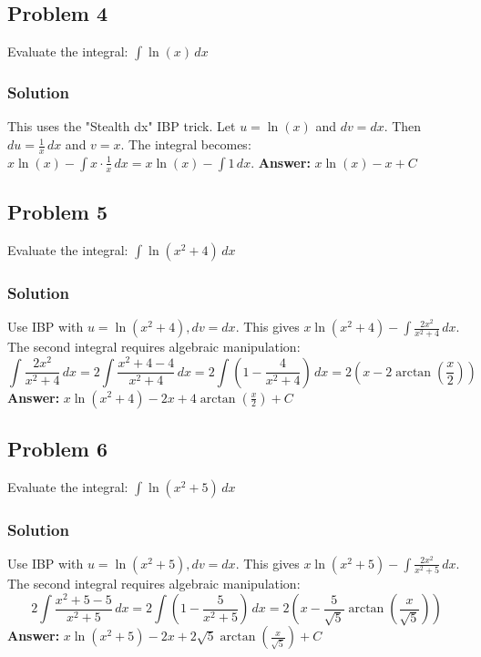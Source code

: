 \documentclass{article}
\begin{document}
\subsection{Problem 4}
Evaluate the integral: $ \int \ln(x) \,dx $
\subsubsection*{Solution}
This uses the "Stealth dx" IBP trick. Let $ u = \ln(x) $ and $ dv = dx $.
Then $ du = \frac{1}{x} \,dx $ and $ v = x $.
The integral becomes: $ x\ln(x) - \int x \cdot \frac{1}{x} \,dx = x\ln(x) - \int 1 \,dx $.
\textbf{Answer:} $ x\ln(x) - x + C $


\subsection{Problem 5}
Evaluate the integral: $ \int \ln(x^2 + 4) \,dx $
\subsubsection*{Solution}
Use IBP with $u=\ln(x^2+4), dv=dx$. This gives $x\ln(x^2+4) - \int \frac{2x^2}{x^2+4} \,dx$.
The second integral requires algebraic manipulation:
\[ \int \frac{2x^2}{x^2+4} \,dx = 2 \int \frac{x^2+4-4}{x^2+4} \,dx = 2 \int \left(1 - \frac{4}{x^2+4}\right) \,dx = 2(x - 2\arctan(\frac{x}{2})) \]
\textbf{Answer:} $ x\ln(x^2+4) - 2x + 4\arctan\left(\frac{x}{2}\right) + C $


\subsection{Problem 6}
Evaluate the integral: $ \int \ln(x^2 + 5) \,dx $
\subsubsection*{Solution}
Use IBP with $u=\ln(x^2+5), dv=dx$. This gives $x\ln(x^2+5) - \int \frac{2x^2}{x^2+5} \,dx$.
The second integral requires algebraic manipulation:
\[ 2 \int \frac{x^2+5-5}{x^2+5} \,dx = 2 \int \left(1 - \frac{5}{x^2+5}\right) \,dx = 2\left(x - \frac{5}{\sqrt{5}}\arctan\left(\frac{x}{\sqrt{5}}\right)\right) \]
\textbf{Answer:} $ x\ln(x^2+5) - 2x + 2\sqrt{5}\arctan\left(\frac{x}{\sqrt{5}}\right) + C $


\end{document}
